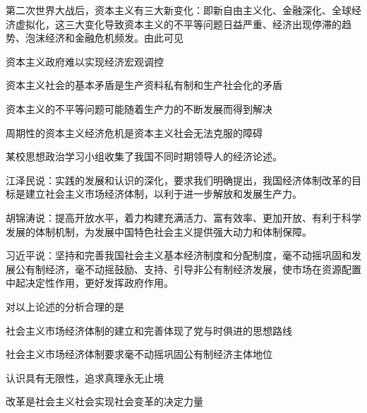 \documentclass{exam-zh}
\newenvironment{kaiti-indented}{
  \parindent=2em
  \CJKfamily{zhkai}
  \setstretch{1.4}
}{
}
\begin{document}
\begin{question}
  第二次世界大战后，资本主义有三大新变化：即新自由主义化、金融深化、全球经济虚拟化，这三大变化导致资本主义的不平等问题日益严重、经济出现停滞的趋势、泡沫经济和金融危机频发。由此可见

   资本主义政府难以实现经济宏观调控

   资本主义社会的基本矛盾是生产资料私有制和生产社会化的矛盾

   资本主义的不平等问题可能随着生产力的不断发展而得到解决

   周期性的资本主义经济危机是资本主义社会无法克服的障碍

  \begin{choices}
  \item {}
  \item {}
  \item {}
  \item {}
  \end{choices}
\end{question}

\begin{question}
  某校思想政治学习小组收集了我国不同时期领导人的经济论述。

  \begin{kaiti-indented}
    江泽民说：实践的发展和认识的深化，要求我们明确提出，我国经济体制改革的目标是建立社会主义市场经济体制，以利于进一步解放和发展生产力。

    胡锦涛说：提高开放水平，着力构建充满活力、富有效率、更加开放、有利于科学发展的体制机制，为发展中国特色社会主义提供强大动力和体制保障。

    习近平说：坚持和完善我国社会主义基本经济制度和分配制度，毫不动摇巩固和发展公有制经济，毫不动摇鼓励、支持、引导非公有制经济发展，使市场在资源配置中起决定性作用，更好发挥政府作用。
  \end{kaiti-indented}

  对以上论述的分析合理的是

   社会主义市场经济体制的建立和完善体现了党与时俱进的思想路线

   社会主义市场经济体制要求毫不动摇巩固公有制经济主体地位

   认识具有无限性，追求真理永无止境

   改革是社会主义社会实现社会变革的决定力量

  \begin{choices}
  \item {}
  \item {}
  \item {}
  \item {}
  \end{choices}
\end{question}
\end{document}

